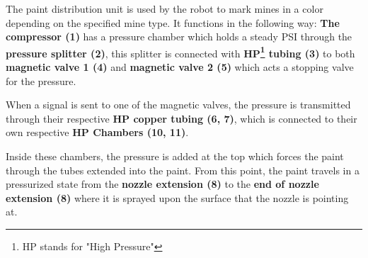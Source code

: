 The paint distribution unit is used by the robot to mark mines in a color depending on the specified mine type. It functions in the following way: \textbf{The compressor (1)} has a pressure chamber which holds a steady PSI through the \textbf{pressure splitter (2)}, this splitter is connected with \textbf{HP\footnote{HP stands for "High Pressure"} tubing (3)} to both \textbf{magnetic valve 1 (4)} and \textbf{magnetic valve 2 (5)} which acts a stopping valve for the pressure. 

\vspace{2mm}

When a signal is sent to one of the magnetic valves, the pressure is transmitted through their respective \textbf{HP copper tubing (6, 7)}, which is connected to their own respective \textbf{HP Chambers (10, 11)}.

\vspace{2mm}

Inside these chambers, the pressure is added at the top which forces the paint through the tubes extended into the paint. From this point, the paint travels in a pressurized state from the \textbf{nozzle extension (8)} to the \textbf{end of nozzle extension (8)} where it is sprayed upon the surface that the nozzle is pointing at.